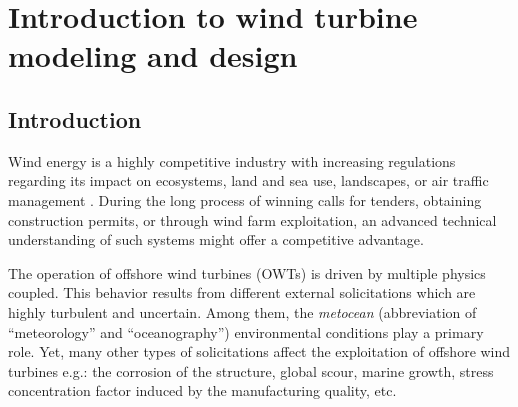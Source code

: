 \cleardoublepage
\chapter{Introduction to wind turbine modeling and design}
\label{chpt:2}
\hfill
\localtableofcontents
\newpage







\section{Introduction}

Wind energy is a highly competitive industry with increasing regulations regarding its impact on ecosystems, land and sea use, landscapes, or air traffic management \citep{eolien_en_mer_2022}. 
During the long process of winning calls for tenders, obtaining construction permits, or through wind farm exploitation, an advanced technical understanding of such systems might offer a competitive advantage. 

The operation of offshore wind turbines (OWTs) is driven by multiple physics coupled. 
This behavior results from different external solicitations which are highly turbulent and uncertain. 
Among them, the \textit{metocean} (abbreviation of ``meteorology'' and ``oceanography'') environmental conditions play a primary role. 
Yet, many other types of solicitations affect the exploitation of offshore wind turbines e.g.: the corrosion of the structure, global scour, marine growth, stress concentration factor induced by the manufacturing quality, etc. 

